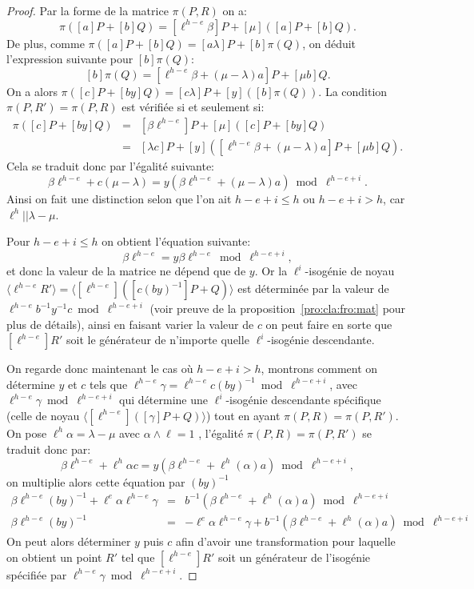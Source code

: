 \documentclass[10pt,a4paper]{book}
\theoremstyle{plain}
\theoremstyle{definition}
\theoremstyle{definition}
\theoremstyle{definition}
\theoremstyle{definition}
\theoremstyle{remark}
\theoremstyle{remark}
\theoremstyle{definition}
\begin{document}
\begin{proof}
Par la forme de la matrice $\pi(P,R)$ on a:
\[ \pi([a]P+[b]Q)=[\ell^{h-e} \beta] P + [\mu] ([a]P+[b]Q).\]
De plus, comme $\pi([a]P+[b]Q)=[a \lambda ]P + [b] \pi(Q)$, on déduit 
l'expression suivante pour $[b]\pi(Q)$:
\[ [b] \pi(Q)=[\ell^{h-e}\beta + (\mu - \lambda)a]P + [\mu b] Q. \]
On a alors $\pi([c]P+[by]Q)=[c\lambda]P+[y]([b]\pi(Q))$. La condition 
$\pi(P,R')=\pi(P,R)$ est vérifiée si et seulement si:
\begin{eqnarray*}
\pi([c]P+[by]Q) &=& [\beta \ell^{h-e}] P + [\mu]([c]P+[by]Q) \\
				&=& [\lambda c]P + [y]([\ell^{h-e}\beta + (\mu - \lambda)a]P + [\mu b] Q).
\end{eqnarray*}
Cela se traduit donc par l'égalité suivante:
\[ \beta \ell^{h-e} + c(\mu-\lambda)=y(\beta \ell^{h-e}+(\mu - \lambda )a) \bmod \ell^{h-e+i}. \]
Ainsi on fait une distinction selon que l'on ait $h-e+i \leqslant h$ ou 
$h-e+i > h$, car $\ell^h || \lambda - \mu$. 

Pour $h-e+i \leqslant h$ on obtient l'équation suivante:
\[\beta \ell^{h-e} = y\beta \ell^{h-e}  \bmod \ell^{h-e+i}, \]
et donc la valeur de la matrice ne dépend que de $y$. Or la
$\ell^i$-isogénie de noyau $\langle \ell^{h-e}R' \rangle= \langle [\ell^{h-e}]
([c(by)^{-1}]P+Q) \rangle$ est déterminée par la 
valeur de $\ell^{h-e}b^{-1}y^{-1}c \bmod \ell^{h-e+i}$ (voir preuve de la 
proposition~\ref{pro:cla:fro:mat} pour plus de détails), ainsi en faisant 
varier la valeur de $c$ on peut faire en sorte que $[\ell^{h-e}]R'$ soit le 
générateur de n'importe quelle $\ell^{i}$-isogénie descendante.

On regarde donc maintenant le cas où $h-e+i>h$, montrons comment on détermine
$y$ et $c$  tels que $\ell^{h-e}\gamma=\ell^{h-e}c(by)^{-1} \bmod 
\ell^{h-e+i}$, avec $\ell^{h-e}\gamma \bmod \ell^{h-e+i}$ qui détermine une 
$\ell^i$-isogénie descendante spécifique (celle de noyau $\langle [\ell^{h-e}]
([\gamma]P+Q) \rangle$) tout en ayant $\pi(P,R)=\pi(P,R')$.
On pose $\ell^{h} \alpha = \lambda - \mu$ avec $\alpha \wedge \ell=1$
, l'égalité $\pi(P,R)=\pi(P,R')$ se traduit donc par:
\[ \beta \ell^{h-e} + \ell^{h}\alpha c=y(\beta \ell^{h-e}+\ell^{h}(\alpha)a) \bmod \ell^{h-e+i}, \]
on multiplie alors cette équation par $(by)^{-1}$
\begin{eqnarray*}
\beta \ell^{h-e}(by)^{-1} + \ell^{e}\alpha \ell^{h-e} \gamma &=& b^{-1}(\beta \ell^{h-e}+\ell^{h}(\alpha)a) \bmod \ell^{h-e+i} \\
\beta \ell^{h-e}(by)^{-1} &=& - \ell^{e}\alpha \ell^{h-e} \gamma + b^{-1}(\beta \ell^{h-e}+\ell^{h}(\alpha)a) \bmod \ell^{h-e+i}
\end{eqnarray*}
On peut alors déterminer $y$ puis $c$ afin d'avoir une transformation pour 
laquelle on obtient un point $R'$ tel que $[\ell^{h-e}]R'$ soit un générateur 
de l'isogénie spécifiée par $\ell^{h-e}\gamma \bmod \ell^{h-e+i}$.
\end{proof}
\end{document}
